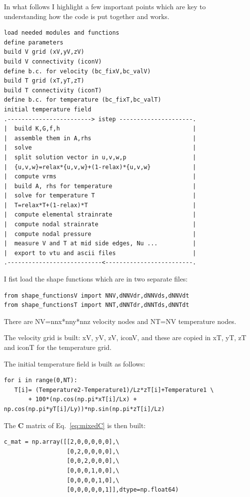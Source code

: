 In what follows I highlight a few important points which are key to understanding how the code
is put together and works. 

\begin{verbatim}
load needed modules and functions
define parameters
build V grid (xV,yV,zV)
build V connectivity (iconV)
define b.c. for velocity (bc_fixV,bc_valV)
build T grid (xT,yT,zT)
build T connectivity (iconT)
define b.c. for temperature (bc_fixT,bc_valT)
initial temperature field
.------------------------> istep ---------------------.
|  build K,G,f,h                                      |
|  assemble them in A,rhs                             |
|  solve                                              |
|  split solution vector in u,v,w,p                   |
|  {u,v,w}=relax*{u,v,w}+(1-relax)*{u,v,w}            |
|  compute vrms                                       |
|  build A, rhs for temperature                       |
|  solve for temperature T                            |
|  T=relax*T+(1-relax)*T                              |
|  compute elemental strainrate                       |
|  compute nodal strainrate                           |
|  compute nodal pressure                             |
|  measure V and T at mid side edges, Nu ...          |
|  export to vtu and ascii files                      | 
.---------------------------<-------------------------.
\end{verbatim}

I fist load the shape functions which are in two separate files:

\begin{lstlisting}
from shape_functionsV import NNV,dNNVdr,dNNVds,dNNVdt
from shape_functionsT import NNT,dNNTdr,dNNTds,dNNTdt
\end{lstlisting}

There are NV=nnx*nny*nnz velocity nodes and NT=NV temperature nodes.

The velocity grid is built: xV, yV, zV, iconV, and 
these are copied in xT, yT, zT and iconT for the temperature grid.  

The initial temperature field is built as follows:
\begin{lstlisting}
for i in range(0,NT):
   T[i]= (Temperature2-Temperature1)/Lz*zT[i]+Temperature1 \
       + 100*(np.cos(np.pi*xT[i]/Lx) + np.cos(np.pi*yT[i]/Ly))*np.sin(np.pi*zT[i]/Lz)
\end{lstlisting}

The ${\bm C}$ matrix of Eq.~\eqref{eq:mixedC} is then built:
\begin{lstlisting}
c_mat = np.array([[2,0,0,0,0,0],\
                  [0,2,0,0,0,0],\
                  [0,0,2,0,0,0],\
                  [0,0,0,1,0,0],\
                  [0,0,0,0,1,0],\
                  [0,0,0,0,0,1]],dtype=np.float64) 
\end{lstlisting}



